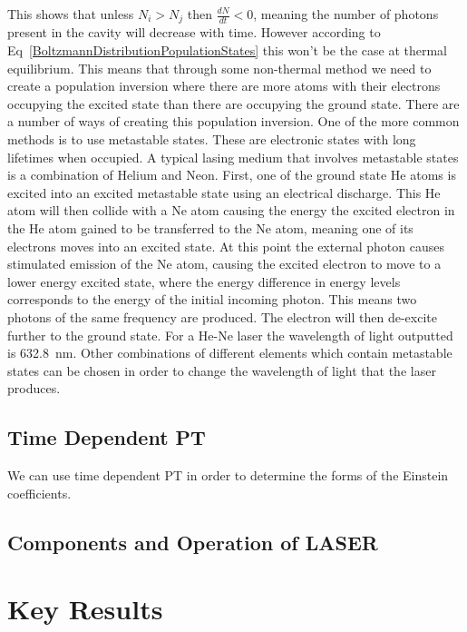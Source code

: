 \noindent This shows that unless $N_i > N_j$ then $\frac{dN}{dt} < 0$, meaning the number of photons present in the cavity will decrease with time. However according to Eq~\ref{BoltzmannDistributionPopulationStates} this won't be the case at thermal equilibrium. This means that through some non-thermal method we need to create a population inversion where there are more atoms with their electrons occupying the excited state than there are occupying the ground state. There are a number of ways of creating this population inversion. One of the more common methods is to use metastable states. These are electronic states with long lifetimes when occupied. A typical lasing medium that involves metastable states is a combination of Helium and Neon. First, one of the ground state He atoms is excited into an excited metastable state using an electrical discharge. This He atom will then collide with a Ne atom causing the energy the excited electron in the He atom gained to be transferred to the Ne atom, meaning one of its electrons moves into an excited state. At this point the external photon causes stimulated emission of the Ne atom, causing the excited electron to move to a lower energy excited state, where the energy difference in energy levels corresponds to the energy of the initial incoming photon. This means two photons of the same frequency are produced. The electron will then de-excite further to the ground state. For a He-Ne laser the wavelength of light outputted is 632.8~nm. Other combinations of different elements which contain metastable states can be chosen in order to change the wavelength of light that the laser produces.

\subsection{Time Dependent PT}

We can use time dependent PT in order to determine the forms of the Einstein coefficients.

\subsection{Components and Operation of LASER}

\section{Key Results}
